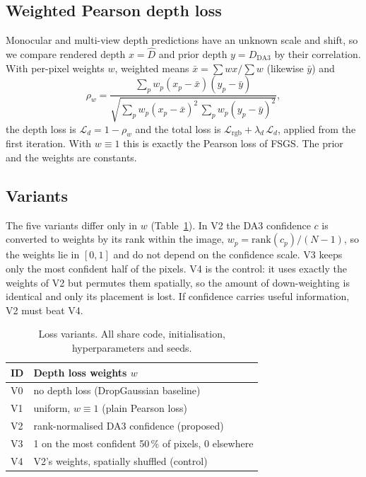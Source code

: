 \subsection{Weighted Pearson depth loss}
Monocular and multi-view depth predictions have an unknown scale and shift, so we compare rendered depth $x = \hat D$ and prior depth $y = D_{\text{DA3}}$ by their correlation. With per-pixel weights $w$, weighted means $\bar x = \sum w x / \sum w$ (likewise $\bar y$) and
\begin{equation}
\rho_w = \frac{\sum_p w_p (x_p-\bar x)(y_p-\bar y)}{\sqrt{\sum_p w_p (x_p-\bar x)^2 \,\sum_p w_p (y_p-\bar y)^2}},
\end{equation}
the depth loss is $\mathcal{L}_d = 1 - \rho_w$ and the total loss is $\mathcal{L}_{\text{rgb}} + \lambda_d\,\mathcal{L}_d$, applied from the first iteration. With $w \equiv 1$ this is exactly the Pearson loss of FSGS. The prior and the weights are constants.

\subsection{Variants}
The five variants differ only in $w$ (Table~\ref{tab:variants}). In V2 the DA3 confidence $c$ is converted to weights by its rank within the image, $w_p = \mathrm{rank}(c_p)/(N-1)$, so the weights lie in $[0,1]$ and do not depend on the confidence scale. V3 keeps only the most confident half of the pixels. V4 is the control: it uses exactly the weights of V2 but permutes them spatially, so the amount of down-weighting is identical and only its placement is lost. If confidence carries useful information, V2 must beat V4.

\begin{table}[t]
\centering
\caption{Loss variants. All share code, initialisation, hyperparameters and seeds.}
\label{tab:variants}
\small
\begin{tabular}{@{}ll@{}}
\toprule
ID & Depth loss weights $w$ \\
\midrule
V0 & no depth loss (DropGaussian baseline) \\
V1 & uniform, $w \equiv 1$ (plain Pearson loss) \\
V2 & rank-normalised DA3 confidence (proposed) \\
V3 & 1 on the most confident 50\,\% of pixels, 0 elsewhere \\
V4 & V2's weights, spatially shuffled (control) \\
\bottomrule
\end{tabular}
\end{table}

